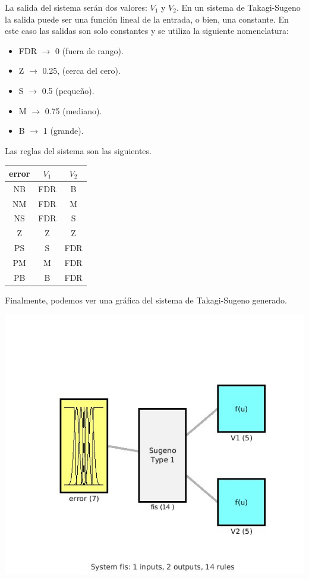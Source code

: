 \documentclass{article}
\begin{document}
La salida del sistema serán dos valores: $V_1$ y $V_2$. En un sistema de Takagi-Sugeno la salida puede ser una función lineal de la entrada, o bien, una constante. En este caso las salidas son solo constantes y se utiliza la siguiente nomenclatura:

\begin{itemize}
\item FDR $\rightarrow$ 0 (fuera de rango).
\item Z $\rightarrow$ 0.25, (cerca del cero).
\item S $\rightarrow$ 0.5 (pequeño).
\item M $\rightarrow$ 0.75 (mediano).
\item B $\rightarrow$ 1 (grande).
\end{itemize}

Las reglas del sistema son las siguientes.

\begin{tabular}{|c|c|c|}
\hline
\textbf{error} & \textbf{$V_1$} & \textbf{$V_2$} \\ \hline
NB & FDR & B \\ \hline
NM & FDR & M \\ \hline
NS & FDR & S \\ \hline
Z & Z & Z \\ \hline
PS & S & FDR \\ \hline
PM & M & FDR \\ \hline
PB & B & FDR \\ \hline
\end{tabular}

Finalmente, podemos ver una gráfica del sistema de Takagi-Sugeno generado.

\begin{center}
\includegraphics[scale=0.5]{sugeno}
\end{center}
\end{document}
